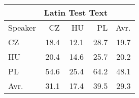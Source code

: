 \begin{tabular}{l|rrr|r}
\hline
 & \multicolumn{3}{c}{Latin Test Text} & \\
\hline
 Speaker   &   CZ &   HU &   PL &   Avr. \\
\hline
 CZ        & 18.4 & 12.1 & 28.7 &   19.7 \\
 HU        & 20.4 & 14.6 & 25.7 &   20.2 \\
 PL        & 54.6 & 25.4 & 64.2 &   48.1 \\
\hline
 Avr.     & 31.1 & 17.4 & 39.5 &   29.3 \\
\hline
\end{tabular}